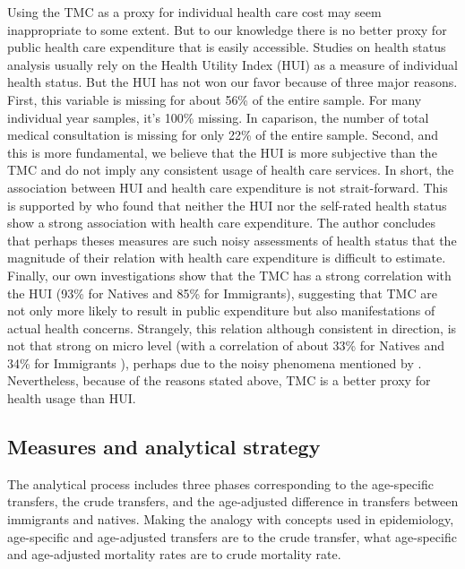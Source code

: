 \vspace{0.7em}\par
Using the TMC as a proxy for individual health care cost may seem inappropriate to some extent.
But to our knowledge there is no better proxy for public health care expenditure that is easily accessible.
Studies on health status analysis usually rely on the Health Utility Index (HUI) as a measure of individual health status.
But the HUI has not won our favor because of three major reasons.
First, this variable is missing for about 56\% of the entire sample.
For many individual year samples, it's 100\% missing.
In caparison, the number of total medical consultation is missing for only 22\% of the entire sample.
Second, and this is more fundamental, we believe that the HUI is more subjective than the TMC and do not imply any consistent usage of health care services.
In short, the association between HUI and health care expenditure is not strait-forward.
This is supported by \citet{Pierard:2016ik} who found that neither the HUI nor the self-rated health status show a strong association with health care expenditure.
The author concludes that perhaps theses measures are such noisy assessments of health status that the magnitude of their relation with health care expenditure is difficult to estimate.
Finally, our own investigations show that the TMC has a strong correlation with the HUI (93\% for Natives and 85\% for Immigrants), suggesting that TMC are not only more likely to result in public expenditure but also manifestations of actual health concerns.
Strangely, this relation although consistent in direction, is not that strong on micro level (with a correlation of about 33\% for Natives and 34\% for Immigrants ), perhaps due to the noisy phenomena mentioned by \citet{Pierard:2016ik}.
Nevertheless, because of the reasons stated above, TMC is a better proxy for health usage than HUI.

\subsection{Measures and analytical strategy}

The analytical process includes three phases corresponding to the age-specific transfers, the crude transfers, and the age-adjusted difference in transfers between immigrants and natives.
Making the analogy with concepts used in epidemiology, age-specific and age-adjusted transfers are to the crude transfer, what age-specific and age-adjusted mortality rates are to crude mortality rate.

